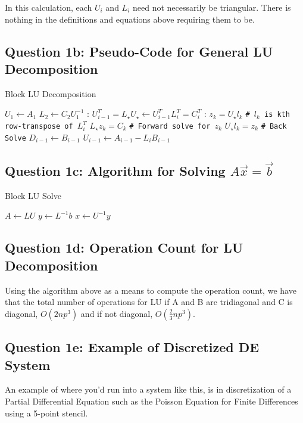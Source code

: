 \documentclass[11pt,a4paper,oneside]{article}
\begin{document}
In this calculation, each $U_i$ and $L_i$ need not necessarily be triangular.
There is nothing in the definitions and equations above requiring them to be.

\subsection{Question 1b: Pseudo-Code for General LU Decomposition}
\begin{algorithm}[H]
\caption{Block LU Decomposition}\label{euclid}
\begin{algorithmic}[1]
	\State $U_1 \gets A_{1}$
	\State $L_{2} \gets C_2 U_1^{-1}$
	:
		\State $U^T_{i-1} = L_\star U_\star \gets U^T_{i-1} L^T_i = C_i^T$
		:
			\State $z_k = U_\star l_k$ \texttt{\# $l_k$ is kth row-transpose of $L_i^T$}
			\State $L_\star z_k = C_k$ \texttt{\# Forward solve for $z_k$}
			\State $U_\star l_k = z_k$ \texttt{\# Back Solve}
		\EndFor
		\State $D_{i-1} \gets B_{i-1}$
		\State $U_{i-1} \gets A_{i-1} - L_i B_{i-1}$
	\EndFor
\EndProcedure
\end{algorithmic}
\end{algorithm}

\subsection{Question 1c: Algorithm for Solving $A\vec{x} = \vec{b}$}
\begin{algorithm}[H]
\caption{Block LU Solve}\label{euclid}
\begin{algorithmic}[1]
	\State $A \gets L U$
	\State $y \gets L^{-1}b$ 
\EndProcedure
{}
	\State $x \gets U^{-1} y$
\EndProcedure
\end{algorithmic}
\end{algorithm}

\subsection{Question 1d: Operation Count for LU Decomposition}
  Using the algorithm above as a means to compute the operation count, we have
that the total number of operations for LU if A and B are tridiagonal and C is diagonal,
$O(2np^{3})$ and if not diagonal, $O(\frac{2}{3} np^{3})$.

\subsection{Question 1e: Example of Discretized DE System}
   An example of where you'd run into a system like this, is in discretization of
a Partial Differential Equation such as the Poisson Equation for Finite Differences
using a 5-point stencil.
\end{document}
